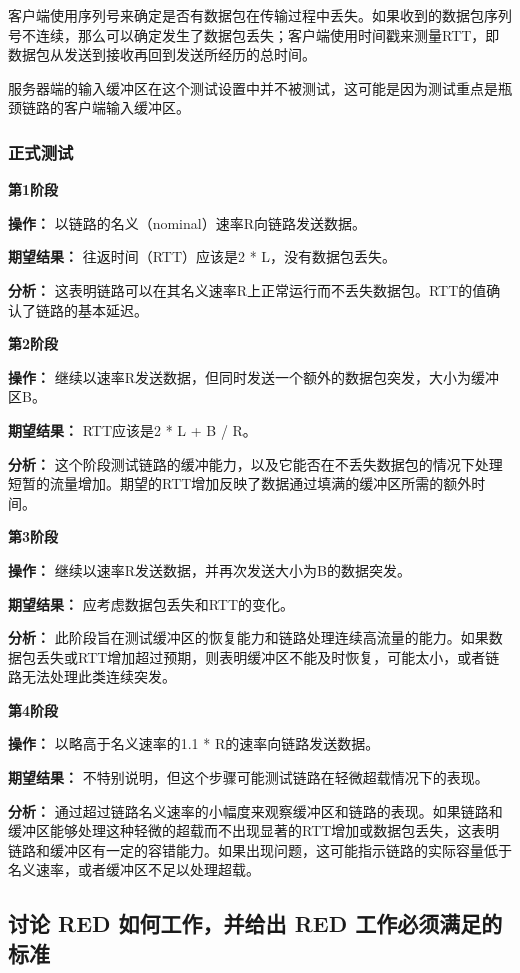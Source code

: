 客户端使用序列号来确定是否有数据包在传输过程中丢失。如果收到的数据包序列号不连续，那么可以确定发生了数据包丢失；客户端使用时间戳来测量RTT，即数据包从发送到接收再回到发送所经历的总时间。

服务器端的输入缓冲区在这个测试设置中并不被测试，这可能是因为测试重点是瓶颈链路的客户端输入缓冲区。

\subsubsection{正式测试}

\textbf{第1阶段}

\textbf{操作：} 以链路的名义（nominal）速率R向链路发送数据。

\textbf{期望结果：} 往返时间（RTT）应该是2 * L，没有数据包丢失。

\textbf{分析：} 这表明链路可以在其名义速率R上正常运行而不丢失数据包。RTT的值确认了链路的基本延迟。

\textbf{第2阶段}

\textbf{操作：} 继续以速率R发送数据，但同时发送一个额外的数据包突发，大小为缓冲区B。

\textbf{期望结果：} RTT应该是2 * L + B / R。

\textbf{分析：} 这个阶段测试链路的缓冲能力，以及它能否在不丢失数据包的情况下处理短暂的流量增加。期望的RTT增加反映了数据通过填满的缓冲区所需的额外时间。

\textbf{第3阶段}

\textbf{操作：} 继续以速率R发送数据，并再次发送大小为B的数据突发。

\textbf{期望结果：} 应考虑数据包丢失和RTT的变化。

\textbf{分析：} 此阶段旨在测试缓冲区的恢复能力和链路处理连续高流量的能力。如果数据包丢失或RTT增加超过预期，则表明缓冲区不能及时恢复，可能太小，或者链路无法处理此类连续突发。

\textbf{第4阶段}

\textbf{操作：} 以略高于名义速率的1.1 * R的速率向链路发送数据。

\textbf{期望结果：} 不特别说明，但这个步骤可能测试链路在轻微超载情况下的表现。

\textbf{分析：} 通过超过链路名义速率的小幅度来观察缓冲区和链路的表现。如果链路和缓冲区能够处理这种轻微的超载而不出现显著的RTT增加或数据包丢失，这表明链路和缓冲区有一定的容错能力。如果出现问题，这可能指示链路的实际容量低于名义速率，或者缓冲区不足以处理超载。

\subsection{讨论 RED 如何工作，并给出 RED 工作必须满足的标准}

